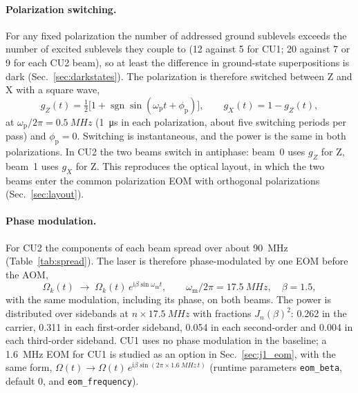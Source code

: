 \documentclass[11pt,a4paper,oneside]{report}
\newcommand{\code}[1]{\texttt{#1}}
\newcommand{\wmod}{\omega_{\mathrm{m}}}
\newcommand{\wpol}{\omega_{\mathrm{p}}}
\begin{document}
\paragraph{Polarization switching.} For any fixed polarization the number of addressed
ground sublevels exceeds the number of excited sublevels they couple to (12 against 5 for
CU1; 20 against 7 or 9 for each CU2 beam), so at least the difference in ground-state
superpositions is dark (Sec.~\ref{sec:darkstates}). The polarization is therefore switched
between Z and X with a square wave,
\begin{equation}
  g_{Z}(t)=\tfrac12\bigl[1+\operatorname{sgn}\sin(\wpol t+\phi_{\mathrm p})\bigr],\qquad
  g_{X}(t)=1-g_{Z}(t),
\end{equation}
at $\wpol/2\pi=\SI{0.5}{MHz}$ (\SI{1}{\micro\second} in each polarization, about five
switching periods per pass) and $\phi_{\mathrm p}=0$. Switching is instantaneous, and the power
is the same in both polarizations. In CU2 the two beams switch in antiphase: beam~0 uses $g_{Z}$
for Z, beam~1 uses $g_{X}$ for Z. This reproduces the optical layout, in which the two beams
enter the common polarization EOM with orthogonal polarizations (Sec.~\ref{sec:layout}).

\paragraph{Phase modulation.} For CU2 the components of each beam spread over about
\SI{90}{MHz} (Table~\ref{tab:spread}). The laser is therefore phase-modulated by one EOM
before the AOM,
\begin{equation}
  \Omega_k(t)\;\to\;\Omega_k(t)\,e^{\mathrm i\beta\sin\wmod t},\qquad
  \wmod/2\pi=\SI{17.5}{MHz},\quad \beta=1.5,
\end{equation}
with the same modulation, including its phase, on both beams. The power is distributed over
sidebands at $n\times\SI{17.5}{MHz}$ with fractions $J_n(\beta)^2$: 0.262 in the carrier,
0.311 in each first-order sideband, 0.054 in each second-order and 0.004 in each third-order
sideband. CU1 uses no phase modulation in the baseline; a \SI{1.6}{MHz} EOM for CU1 is
studied as an option in Sec.~\ref{sec:j1_eom}, with the same form,
$\Omega(t)\to\Omega(t)\,e^{\mathrm i\beta\sin(2\pi\times\SI{1.6}{MHz}\,t)}$ (runtime
parameters \code{eom\_beta}, default 0, and \code{eom\_frequency}).
\end{document}
